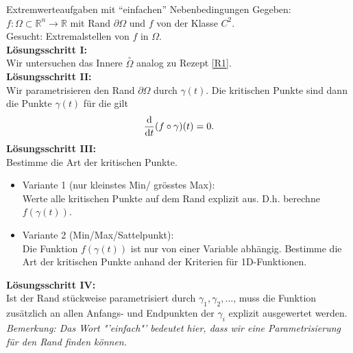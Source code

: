 \begin{Rezept}[label=R2]{Extremwerteaufgaben mit ``einfachen'' Nebenbedingungen}{}
	Gegeben: $f:\Omega\subset \mathbb{R}^n \to \mathbb{R}$ mit Rand $\partial{\Omega}$ und $f$ von der Klasse $C^2$.\\
	Gesucht: Extremalstellen von $f$ in $\Omega$.\\
	\newline
	\textbf{Lösungsschritt I:}\\
	Wir untersuchen das Innere $\overset{\circ}{\Omega}$ analog zu Rezept \ref{R1}.\\
	\newline
	\textbf{Lösungsschritt II:}\\
	Wir parametrisieren den Rand $\partial \Omega$ durch $\gamma(t)$. Die kritischen Punkte sind dann die Punkte $\gamma(t)$ für die gilt
	\begin{equation*}
	\dv{t}(f\circ \gamma)(t) = 0.
	\end{equation*}
	\newline
	\textbf{Lösungsschritt III:}\\
	Bestimme die Art der kritischen Punkte.
	\begin{itemize}
		\item Variante 1 (nur kleinstes Min/ grösstes Max): \\Werte alle kritischen Punkte auf dem Rand explizit aus. D.h. berechne $f(\gamma(t))$.
		\item Variante 2 (Min/Max/Sattelpunkt):\\
		Die Funktion $f(\gamma(t))$ ist nur von einer Variable abhängig. Bestimme die Art der kritischen Punkte anhand der Kriterien für 1D-Funktionen.
	\end{itemize}
	
	\textbf{Lösungsschritt IV:}\\
	Ist der Rand stückweise parametrisiert durch $\gamma_1,\gamma_2,\dots$, muss die Funktion zusätzlich an allen Anfangs- und Endpunkten der $\gamma_i$  explizit ausgewertet werden.\\
	\newline
	\textit{Bemerkung: Das Wort "'einfach"' bedeutet hier, dass wir eine Parametrisierung für den Rand finden können.}
\end{Rezept}

